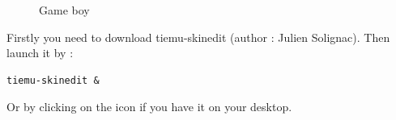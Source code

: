 \documentclass[10pt]{report}
\begin{document}
\begin{figure}[H]
\centering
{}
\caption{Game boy}
\end{figure}

Firstly you need to download tiemu-skinedit (author : Julien Solignac).\newline
Then launch it by :\newline
\begin{lstlisting}
tiemu-skinedit &
\end{lstlisting}
Or by clicking on the icon if you have it on your desktop.\newline
\end{document}
